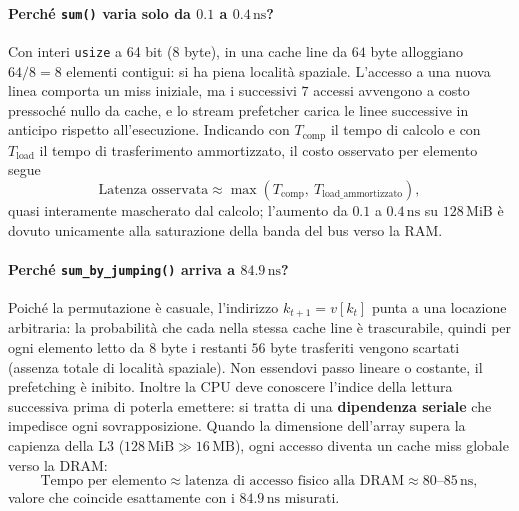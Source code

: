 \paragraph{Perch\'e \texttt{sum()} varia solo da $0.1$ a $0.4\,\text{ns}$?} Con interi \texttt{usize} a 64 bit ($8$ byte), in una cache line da $64$ byte alloggiano $64/8 = 8$ elementi contigui: si ha piena localit\`a spaziale. L'accesso a una nuova linea comporta un miss iniziale, ma i successivi $7$ accessi avvengono a costo pressoch\'e nullo da cache, e lo stream prefetcher carica le linee successive in anticipo rispetto all'esecuzione. Indicando con $T_{\text{comp}}$ il tempo di calcolo e con $T_{\text{load}}$ il tempo di trasferimento ammortizzato, il costo osservato per elemento segue
\[
\text{Latenza osservata} \approx \max\!\left(T_{\text{comp}},\ T_{\text{load\_ammortizzato}}\right),
\]
quasi interamente mascherato dal calcolo; l'aumento da $0.1$ a $0.4\,\text{ns}$ su $128\,\text{MiB}$ \`e dovuto unicamente alla saturazione della banda del bus verso la RAM.

\paragraph{Perch\'e \texttt{sum\_by\_jumping()} arriva a $84.9\,\text{ns}$?} Poich\'e la permutazione \`e casuale, l'indirizzo $k_{t+1} = v[k_t]$ punta a una locazione arbitraria: la probabilit\`a che cada nella stessa cache line \`e trascurabile, quindi per ogni elemento letto da $8$ byte i restanti $56$ byte trasferiti vengono scartati (assenza totale di localit\`a spaziale). Non essendovi passo lineare o costante, il prefetching \`e inibito. Inoltre la CPU deve conoscere l'indice della lettura successiva prima di poterla emettere: si tratta di una \textbf{dipendenza seriale} che impedisce ogni sovrapposizione. Quando la dimensione dell'array supera la capienza della L3 ($128\,\text{MiB} \gg 16\,\text{MB}$), ogni accesso diventa un cache miss globale verso la DRAM:
\[
\text{Tempo per elemento} \approx \text{latenza di accesso fisico alla DRAM} \approx 80\text{--}85\,\text{ns},
\]
valore che coincide esattamente con i $84.9\,\text{ns}$ misurati.

